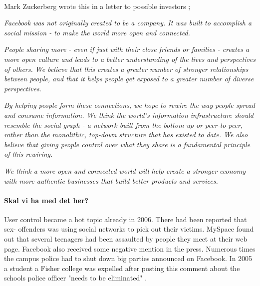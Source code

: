 \paragraph{}






\paragraph{}
Mark Zuckerberg wrote this in a letter to possible investors \cite{LetterToInvestors};

\textit{Facebook was not originally created to be a company. It was built to accomplish a social mission - to make the world more open and connected.}

\textit{People sharing more - even if just with their close friends or families - creates a more open culture and leads to a better understanding of the lives and perspectives of others. We believe that this creates a greater number of stronger relationships between people, and that it helps people get exposed to a greater number of diverse perspectives.}

\textit{By helping people form these connections, we hope to rewire the way people spread and consume information. We think the world's information infrastructure should resemble the social graph - a network built from the bottom up or peer-to-peer, rather than the monolithic, top-down structure that has existed to date. We also believe that giving people control over what they share is a fundamental principle of this rewiring.}

\textit{We think a more open and connected world will help create a stronger economy with more authentic businesses that build better products and services.}

\paragraph{Skal vi ha med det her?}
User control became a hot topic already in 2006. There had been reported that sex- offenders was using social networks to pick out their victims. MySpace found out that several teenagers had been assaulted by people they meet at their web page. Facebook also received some negative mention in the press. Numerous times the campus police had to shut down big parties announced on Facebook. In 2005 a student a Fisher college was expelled after posting this comment about the schools police officer "needs to be eliminated" \cite{MeMedia}.